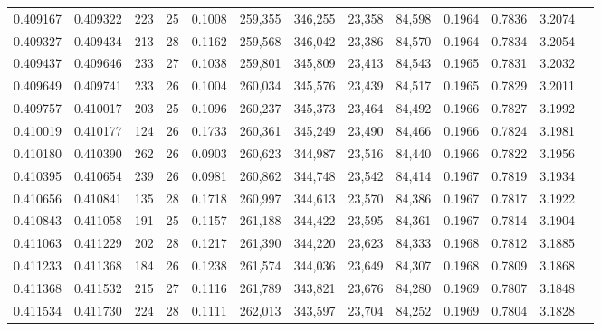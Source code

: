 \begin{tabular}{rrrrrrrrrrrrr}
0.409167 & 0.409322 &   223 &  25 &                                     0.1008 & 259,355 & 346,255 &  23,358 &  84,598 & 0.1964 & 0.7836 & 3.2074 \\
0.409327 & 0.409434 &   213 &  28 &                                     0.1162 & 259,568 & 346,042 &  23,386 &  84,570 & 0.1964 & 0.7834 & 3.2054 \\
0.409437 & 0.409646 &   233 &  27 &                                     0.1038 & 259,801 & 345,809 &  23,413 &  84,543 & 0.1965 & 0.7831 & 3.2032 \\
0.409649 & 0.409741 &   233 &  26 &                                     0.1004 & 260,034 & 345,576 &  23,439 &  84,517 & 0.1965 & 0.7829 & 3.2011 \\
0.409757 & 0.410017 &   203 &  25 &                                     0.1096 & 260,237 & 345,373 &  23,464 &  84,492 & 0.1966 & 0.7827 & 3.1992 \\
0.410019 & 0.410177 &   124 &  26 &                                     0.1733 & 260,361 & 345,249 &  23,490 &  84,466 & 0.1966 & 0.7824 & 3.1981 \\
0.410180 & 0.410390 &   262 &  26 &                                     0.0903 & 260,623 & 344,987 &  23,516 &  84,440 & 0.1966 & 0.7822 & 3.1956 \\
0.410395 & 0.410654 &   239 &  26 &                                     0.0981 & 260,862 & 344,748 &  23,542 &  84,414 & 0.1967 & 0.7819 & 3.1934 \\
0.410656 & 0.410841 &   135 &  28 &                                     0.1718 & 260,997 & 344,613 &  23,570 &  84,386 & 0.1967 & 0.7817 & 3.1922 \\
0.410843 & 0.411058 &   191 &  25 &                                     0.1157 & 261,188 & 344,422 &  23,595 &  84,361 & 0.1967 & 0.7814 & 3.1904 \\
0.411063 & 0.411229 &   202 &  28 &                                     0.1217 & 261,390 & 344,220 &  23,623 &  84,333 & 0.1968 & 0.7812 & 3.1885 \\
0.411233 & 0.411368 &   184 &  26 &                                     0.1238 & 261,574 & 344,036 &  23,649 &  84,307 & 0.1968 & 0.7809 & 3.1868 \\
0.411368 & 0.411532 &   215 &  27 &                                     0.1116 & 261,789 & 343,821 &  23,676 &  84,280 & 0.1969 & 0.7807 & 3.1848 \\
0.411534 & 0.411730 &   224 &  28 &                                     0.1111 & 262,013 & 343,597 &  23,704 &  84,252 & 0.1969 & 0.7804 & 3.1828 \\

\end{tabular}
